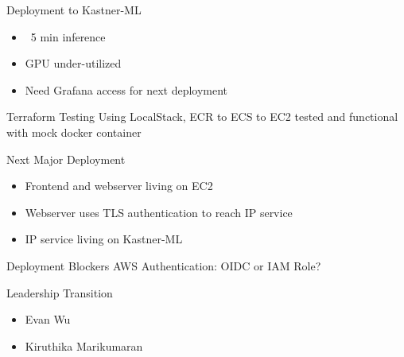 
\begin{frame}{Deployment to Kastner-ML}
    \begin{itemize}
        \item ~5 min inference
        \item GPU under-utilized
        \item Need Grafana access for next deployment
    \end{itemize} 
\end{frame}

\begin{frame}{Terraform Testing}
    Using LocalStack, ECR to ECS to EC2 tested and functional with mock docker container
\end{frame}

\begin{frame}{Next Major Deployment}
    \begin{itemize}
        \item Frontend and webserver living on EC2
        \item Webserver uses TLS authentication to reach IP service
        \item IP service living on Kastner-ML
    \end{itemize}
\end{frame}

\begin{frame}{Deployment Blockers}
    AWS Authentication: OIDC or IAM Role?
\end{frame}

\begin{frame}{Leadership Transition}
    \begin{itemize}
        \item Evan Wu
        \item Kiruthika Marikumaran
    \end{itemize}
\end{frame}



